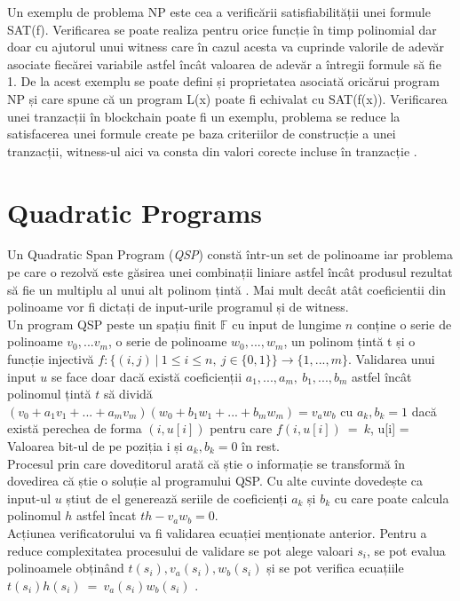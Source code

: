 Un exemplu de problema NP este cea a verificării satisfiabilității unei formule SAT(f). Verificarea se poate realiza pentru orice funcție în timp polinomial dar doar cu ajutorul unui witness care în cazul acesta va cuprinde valorile de adevăr asociate fiecărei variabile astfel încât valoarea de adevăr a întregii formule să fie 1. De la acest exemplu se poate defini și proprietatea asociată oricărui program NP și care spune că un program L(x) poate fi echivalat cu SAT(f(x)). Verificarea unei tranzacții în blockchain poate fi un exemplu, problema se reduce la satisfacerea unei formule create pe baza criteriilor de construcție a unei tranzacții, witness-ul aici va consta din valori corecte incluse în tranzacție \cite{ZKS_Crypto_Basic}.\\

\section{Quadratic Programs}

Un Quadratic Span Program (\textit{QSP}) constă într-un set de polinoame iar problema pe care o rezolvă este găsirea unei combinații liniare astfel încât produsul rezultat să fie un multiplu al unui alt polinom țintă \cite{ZKS_Crypto_Basic2}. Mai mult decât atât coeficientii din polinoame vor fi dictați de input-urile programul și de witness.\\

Un program QSP peste un spațiu finit $\mathbb{F}$ cu input de lungime $n$ conține o serie de polinoame $v_0,...v_m$, o serie de polinoame $w_0,...,w_m$, un polinom țintă t și o funcție injectivă $f:\{(i,j) \ | \ 1 \leq i \leq n, \  j \in \{0,1\}\}\rightarrow\{1,...,m\}$. Validarea unui input $u$ se face doar dacă există coeficienții $a_1,...,a_m,\ b_1,...,b_m$ astfel încât polinomul țintă $t$ să dividă $(v_0 + a_1v_1 + ... + a_mv_m)(w_0 + b_1w_1 + ... + b_mw_m) = v_aw_b$ cu $a_k,b_k = 1$ dacă există perechea de forma $(i,u[i])$ pentru care $f(i,u[i])\ =\ k$, u[i] = Valoarea bit-ul de pe poziția i și $a_k,b_k = 0$ în rest.\\

Procesul prin care doveditorul arată că știe o informație se transformă în dovedirea că știe o soluție al programului QSP. Cu alte cuvinte dovedește ca input-ul $u$ știut de el generează seriile de coeficienți $a_k$ și $b_k$ cu care poate calcula polinomul $h$ astfel încat $th-v_aw_b=0$.\\

Acțiunea verificatorului va fi validarea ecuației menționate anterior. Pentru a reduce complexitatea procesului de validare se pot alege valoari $s_i$, se pot evalua polinoamele obținând $t(s_i),v_a(s_i),w_b(s_i)$ și se pot verifica ecuațiile $t(s_i)h(s_i)\ =\ v_a(s_i)w_b(s_i)$ \cite{ZKS_Crypto_Basic2}.\\


